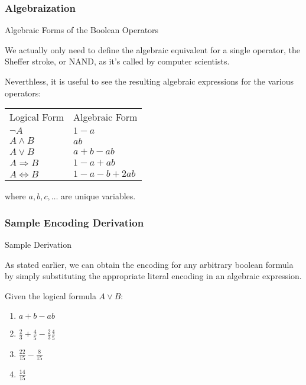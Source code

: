 \documentclass{beamer}
\begin{document}
\begin{frame}
\frametitle{Algebraization}
\begin{alertblock}
{Algebraic Forms of the Boolean Operators}

{\small
We actually only need to define the algebraic equivalent for a single operator, the Sheffer stroke, or NAND, as it's called by computer scientists.

Neverthless, it is useful to see the resulting algebraic expressions for the various operators:}

\begin{center}
\begin{tabular}{ll}\hline
Logical Form            & Algebraic Form\\
\(\neg A\)              & \(1 - a\)\\
\(A \land B\)           & \(ab\)\\
\(A \lor B\)            & \(a + b - ab\)\\
\(A \Rightarrow B\)     & \(1 - a + ab\)\\
\(A \Leftrightarrow B\) & \(1 - a - b + 2ab\)\\\hline
\end{tabular}
\end{center}

where \(a,b,c,\ldots\) are unique variables.

\end{alertblock}
\end{frame}

\begin{frame}
\frametitle{Sample Encoding Derivation}
\begin{exampleblock}
{Sample Derivation}

As stated earlier, we can obtain the encoding for any arbitrary boolean formula by simply substituting the appropriate literal encoding in an algebraic expression.

Given the logical formula \(A \lor B\):

\begin{enumerate}
\item \(a + b - ab \)
\item \(\frac{2}{3} + \frac{4}{5} - \frac{2}{3} \frac{4}{5} \)
\item \(\frac{22}{15} - \frac{8}{15} \)
\item \(\frac{14}{15} \)
\end{enumerate}

\end{exampleblock}
\end{frame}
\end{document}

